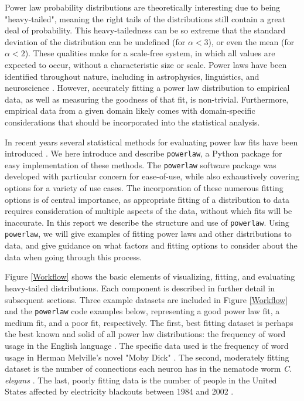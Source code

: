\documentclass[10pt]{article}
\begin{document}
Power law probability distributions are theoretically interesting due to being  "heavy-tailed", meaning the right tails of the distributions still contain a great deal of probability. This heavy-tailedness can be so extreme that the standard deviation of the distribution can be undefined (for $\alpha<3$), or even the mean (for $\alpha<2$). These qualities make for a scale-free system, in which all values are expected to occur, without a characteristic size or scale. Power laws have been identified throughout nature, including in astrophysics, linguistics, and neuroscience \cite{Michel2011, Zipf1935, Beggs2003, Shriki2013}. However, accurately fitting a power law distribution to empirical data, as well as measuring the goodness of that fit, is non-trivial. Furthermore, empirical data from a given domain likely comes with domain-specific considerations that should be incorporated into the statistical analysis.

In recent years several statistical methods for evaluating power law fits have been introduced \cite{Clauset2009, Klaus2011}. We here introduce and describe \verb$powerlaw$, a Python package for easy implementation of these methods. The \verb$powerlaw$ software package was developed with particular concern for ease-of-use, while also exhaustively covering options for a variety of use cases. The incorporation of these numerous fitting options is of central importance, as appropriate fitting of a distribution to data requires consideration of multiple aspects of the data, without which fits will be inaccurate. In this report we describe the structure and use of \verb$powerlaw$. Using \verb$powerlaw$, we will give examples of fitting power laws and other distributions to data, and give guidance on what factors and fitting options to consider about the data when going through this process.

Figure \ref{Workflow} shows the basic elements of visualizing, fitting, and evaluating heavy-tailed distributions. Each component is described in further detail in subsequent sections. Three example datasets are included in Figure \ref{Workflow} and the \verb$powerlaw$ code examples below, representing a good power law fit, a medium fit, and a poor fit, respectively. The first, best fitting dataset is perhaps the best known and solid of all power law distributions: the frequency of word usage in the English language \cite{Zipf1935}. The specific data used is the frequency of word usage in Herman Melville's novel "Moby Dick" \cite{Newman2005}. The second, moderately fitting dataset is the number of connections each neuron has in the nematode worm \textit{C. elegans} \cite{Towlson2013,Varshney2011}. The last, poorly fitting data is the number of people in the United States affected by electricity blackouts between 1984 and 2002 \cite{Newman2005}. 
\end{document}
